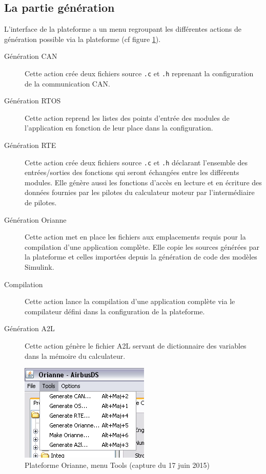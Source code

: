 \subsection{La partie génération}
L'interface de la plateforme a un menu regroupant les différentes actions de génération possible via la plateforme (cf figure \ref{fig:toolsMenu}).
\begin{description}
  \item[Génération CAN] Cette action crée deux fichiers source {\tt.c} et {\tt .h} reprenant la configuration de la communication CAN.
  \item[Génération RTOS] Cette action reprend les listes des points d'entrée des modules de l'application en fonction de leur place dans la configuration.
  \item[Génération RTE] Cette action crée deux fichiers source {\tt.c} et {\tt .h} déclarant l'ensemble des entrées/sorties des fonctions qui seront échangées entre les différents modules. Elle génère aussi les fonctions d'accès en lecture et en écriture des données fournies par les pilotes du calculateur moteur par l'intermédiaire de pilotes.
  \item[Génération Orianne] Cette action met en place les fichiers aux emplacements requis pour la compilation d'une application complète. Elle copie les sources générées par la plateforme et celles importées depuis la génération de code des modèles Simulink\up{\circledR}.
  \item[Compilation] Cette action lance la compilation d'une application complète via le compilateur défini dans la configuration de la plateforme.
  \item[Génération A2L] Cette action génère le fichier A2L servant de dictionnaire des variables dans la mémoire du calculateur.
\end{description}

\begin{figure}[h]
  \centering
  \includegraphics[scale=0.7]{images/toolsMenu}
  \caption{Plateforme Orianne, menu Tools (capture du 17 juin 2015)}
  \label{fig:toolsMenu}
\end{figure}

